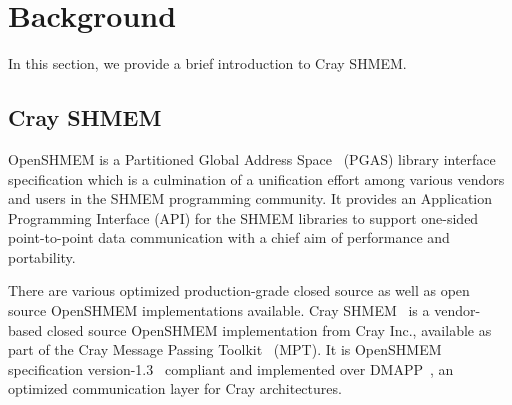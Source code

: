 \section{Background}
\label{src:bground}

In this section, we provide a brief introduction to Cray SHMEM.%

\subsection{Cray SHMEM}
\label{src:bg/crayshmem}
OpenSHMEM is a Partitioned Global Address Space~\cite{pgas} (PGAS) library
interface specification which is a culmination of a unification effort
among various vendors and users in the SHMEM programming community. It
provides an Application Programming Interface (API) for the SHMEM libraries
to support one-sided point-to-point data communication with a chief aim of
performance and portability. %

There are various optimized production-grade closed source as well as open source
OpenSHMEM implementations available. Cray SHMEM~\cite{csma} is a vendor-based
closed source OpenSHMEM implementation from Cray Inc., available as part of the
Cray Message Passing Toolkit~\cite{mpt} (MPT). It is OpenSHMEM
specification version-1.3~\cite{osm13} compliant and implemented over
DMAPP~\cite{dmapp}, an
optimized communication layer for Cray architectures. %

